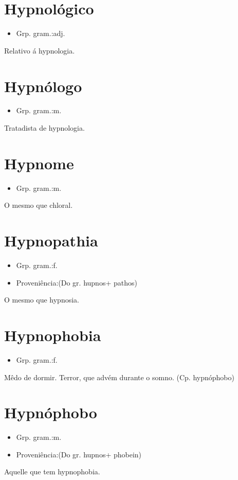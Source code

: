 \documentclass{article}
\begin{document}
\section{Hypnológico}
\begin{itemize}
\item {Grp. gram.:adj.}
\end{itemize}
Relativo á hypnologia.
\section{Hypnólogo}
\begin{itemize}
\item {Grp. gram.:m.}
\end{itemize}
Tratadista de hypnologia.
\section{Hypnome}
\begin{itemize}
\item {Grp. gram.:m.}
\end{itemize}
O mesmo que \textunderscore chloral\textunderscore .
\section{Hypnopathia}
\begin{itemize}
\item {Grp. gram.:f.}
\end{itemize}
\begin{itemize}
\item {Proveniência:(Do gr. \textunderscore hupnos\textunderscore  + \textunderscore pathos\textunderscore )}
\end{itemize}
O mesmo que \textunderscore hypnosia\textunderscore .
\section{Hypnophobia}
\begin{itemize}
\item {Grp. gram.:f.}
\end{itemize}
Mêdo de dormir.
Terror, que advém durante o somno.
(Cp. \textunderscore hypnóphobo\textunderscore )
\section{Hypnóphobo}
\begin{itemize}
\item {Grp. gram.:m.}
\end{itemize}
\begin{itemize}
\item {Proveniência:(Do gr. \textunderscore hupnos\textunderscore  + \textunderscore phobein\textunderscore )}
\end{itemize}
Aquelle que tem hypnophobia.
\end{document}
